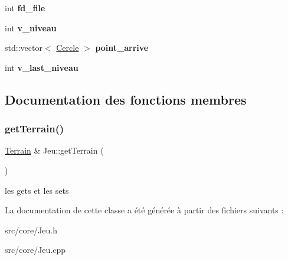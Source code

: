 \begin{DoxyCompactItemize}
int {\bfseries fd\+\_\+file}
\item 
\mbox{\label{class_jeu_a49b468e50eac58873b84f547a1b7c1db}} 
int {\bfseries v\+\_\+niveau}
\item 
\mbox{\label{class_jeu_a2d848be82aaa0ee159e005b31012cc4e}} 
std\+::vector$<$ \mbox{\hyperlink{class_cercle}{Cercle}} $>$ {\bfseries point\+\_\+arrive}
\item 
\mbox{\label{class_jeu_a312c2f0390dfcf4ae5508d3232ab5e0f}} 
int {\bfseries v\+\_\+last\+\_\+niveau}
\end{DoxyCompactItemize}


\subsection{Documentation des fonctions membres}
\mbox{\label{class_jeu_a4b5b107671761a6bb963475bf4ecc8dd}} 
\subsubsection{\texorpdfstring{get\+Terrain()}{getTerrain()}}
{\footnotesize\ttfamily \mbox{\hyperlink{class_terrain}{Terrain}} \& Jeu\+::get\+Terrain (\begin{DoxyParamCaption}{ }\end{DoxyParamCaption})}

les gets et les sets 

La documentation de cette classe a été générée à partir des fichiers suivants \+:\begin{DoxyCompactItemize}
\item 
src/core/Jeu.\+h\item 
src/core/Jeu.\+cpp\end{DoxyCompactItemize}
